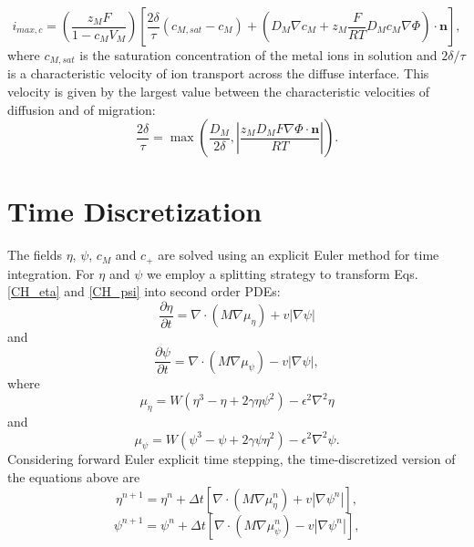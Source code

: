 \documentclass[11pt]{article}
\renewcommand{\=}[1]{\stackrel{#1}{=}} %
\theoremstyle{definition}
\theoremstyle{remark}
\begin{document}
\begin{equation}
i_{max,c}=\left( \frac{z_M F}{1-c_M V_M} \right) \left[ \frac{2\delta}{\tau}(c_{M,sat} - c_M ) + \left( D_M\nabla c_M +z_M\frac{F}{RT}D_M c_M \nabla \Phi \right) \cdot \mathbf{n} \right], 
\end{equation}
where $c_{M,sat}$ is the saturation concentration of the metal ions in solution and $2\delta/\tau$ is a characteristic velocity of ion transport across the diffuse interface. This velocity is given by the largest value between the characteristic velocities of diffusion and of migration:
\begin{equation}
\frac{2\delta}{\tau}=\max \left( \frac{D_M}{2\delta}, \left| \frac{z_M D_M F \nabla \Phi \cdot \mathbf{n}}{RT} \right| \right).
\end{equation}
\section{Time Discretization}
The fields $\eta$, $\psi$, $c_M$ and $c_+$ are solved using an explicit Euler method for time integration. For  $\eta$ and $\psi$ we employ a splitting strategy to transform Eqs. \eqref{CH_eta} and \eqref{CH_psi} into second order PDEs:
\begin{equation}
\label{eta_eq}
 \frac{\partial \eta}{\partial t} = \nabla \cdot \left( M \nabla  \mu_\eta \right) + v |\nabla \psi|
\end{equation}
and
\begin{equation}
\label{psi_eq}
\frac{\partial \psi}{\partial t} = \nabla \cdot \left( M \nabla \mu_\psi \right) - v |\nabla \psi|,
\end{equation}
where 
\begin{equation}
\label{mueta_eq}
\mu_\eta=W \left( \eta^3 - \eta +2 \gamma \eta \psi^2 \right) -\epsilon^2 \nabla^2 \eta
\end{equation}
and
\begin{equation}
\label{mupsi_eq}
\mu_\psi=W \left( \psi^3 - \psi +2 \gamma \psi  \eta^2 \right) -\epsilon^2 \nabla^2 \psi.
\end{equation}
Considering forward Euler explicit time stepping, the time-discretized version of the equations above are
\begin{equation}
\label{eta_eq_td}
\eta^{n+1} = \eta^n + \Delta t \left[ \nabla \cdot \left( M \nabla \mu_\eta^n \right) + v |\nabla \psi^n| \right],
\end{equation}
\begin{equation}
\label{psi_eq_td}
\psi^{n+1} = \psi^n +  \Delta t \left[  \nabla \cdot \left( M \nabla \mu_\psi^n \right) - v |\nabla \psi^n | \right],
\end{equation}
\end{document}
